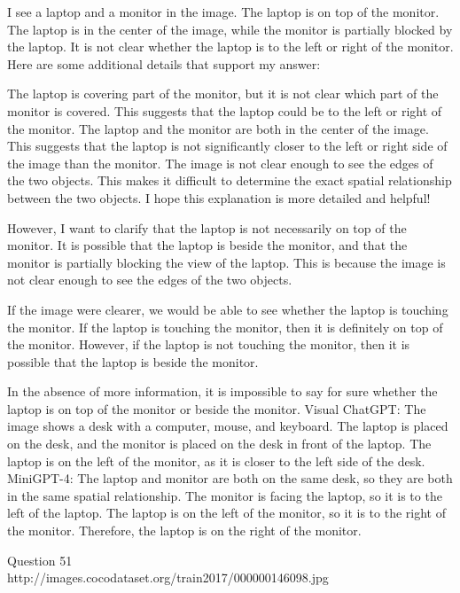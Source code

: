 \begin{enumerate}
    I see a laptop and a monitor in the image.
    The laptop is on top of the monitor.
    The laptop is in the center of the image, while the monitor is partially blocked by the laptop.
    It is not clear whether the laptop is to the left or right of the monitor.
    Here are some additional details that support my answer:
    
    The laptop is covering part of the monitor, but it is not clear which part of the monitor is covered. This suggests that the laptop could be to the left or right of the monitor.
    The laptop and the monitor are both in the center of the image. This suggests that the laptop is not significantly closer to the left or right side of the image than the monitor.
    The image is not clear enough to see the edges of the two objects. This makes it difficult to determine the exact spatial relationship between the two objects.
    I hope this explanation is more detailed and helpful!
    
    However, I want to clarify that the laptop is not necessarily on top of the monitor. It is possible that the laptop is beside the monitor, and that the monitor is partially blocking the view of the laptop. This is because the image is not clear enough to see the edges of the two objects.
    
    If the image were clearer, we would be able to see whether the laptop is touching the monitor. If the laptop is touching the monitor, then it is definitely on top of the monitor. However, if the laptop is not touching the monitor, then it is possible that the laptop is beside the monitor.
    
    In the absence of more information, it is impossible to say for sure whether the laptop is on top of the monitor or beside the monitor.
    \subitem Visual ChatGPT: The image shows a desk with a computer, mouse, and keyboard. The laptop is placed on the desk, and the monitor is placed on the desk in front of the laptop. The laptop is on the left of the monitor, as it is closer to the left side of the desk.
    \subitem MiniGPT-4: The laptop and monitor are both on the same desk, so they are both in the same spatial relationship. The monitor is facing the laptop, so it is to the left of the laptop. The laptop is on the left of the monitor, so it is to the right of the monitor. Therefore, the laptop is on the right of the monitor.
\end{enumerate}
Question 51\\
http://images.cocodataset.org/train2017/000000146098.jpg
